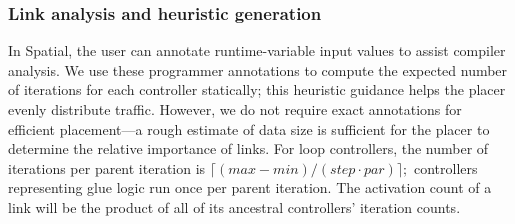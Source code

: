 

\subsubsection{Link analysis and heuristic generation} \label{sec:heuristic}
In Spatial, the user can annotate runtime-variable input values to assist compiler analysis.  
We use these programmer annotations to compute the expected number of iterations for each controller statically; this heuristic guidance helps the placer evenly distribute traffic. 
However, we do not require exact annotations for efficient placement---a rough estimate of data size is sufficient for the placer to determine the relative importance of links.
For loop controllers, the number of iterations per parent iteration is $\lceil(max-min)/(step\cdot par)\rceil;$ controllers representing glue logic run once per parent iteration.
The activation count of a link will be the product of all of its ancestral controllers' iteration counts.

